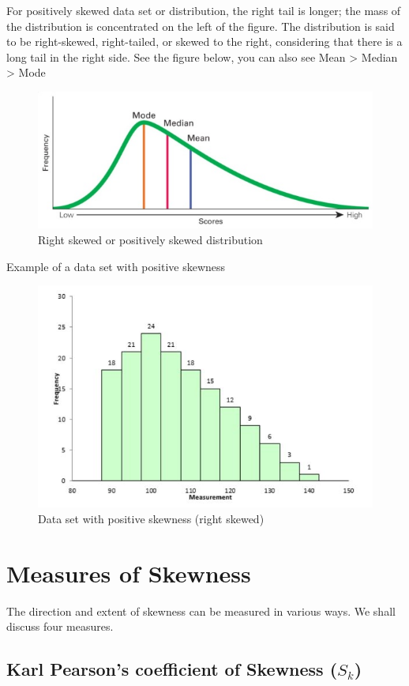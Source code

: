 \documentclass[
]{book}
\begin{document}
For positively skewed data set or distribution, the right tail is
longer; the mass of the distribution is concentrated on the left of the
figure. The distribution is said to be right-skewed, right-tailed, or
skewed to the right, considering that there is a long tail in the right
side. See the figure below, you can also see Mean \textgreater{} Median \textgreater{} Mode

\begin{figure}

{\centering \includegraphics[width=0.5\linewidth]{images/image7_5} 

}

\caption{Right skewed or positively skewed distribution}\label{fig:sk4}
\end{figure}

Example of a data set with positive skewness

\begin{figure}

{\centering \includegraphics[width=0.5\linewidth]{images/image8_5} 

}

\caption{Data set with positive skewness (right skewed)}\label{fig:sk5}
\end{figure}

\hypertarget{measures-of-skewness}{%
\section{Measures of Skewness}\label{measures-of-skewness}}

The direction and extent of skewness can be measured in various ways. We
shall discuss four measures.

\hypertarget{karl-pearsons-coefficient-of-skewness-s_k}{%
\subsection{\texorpdfstring{Karl Pearson's coefficient of Skewness (\textbf{\(S_{k}\)})}{Karl Pearson's coefficient of Skewness (S\_\{k\})}}\label{karl-pearsons-coefficient-of-skewness-s_k}}
\end{document}
